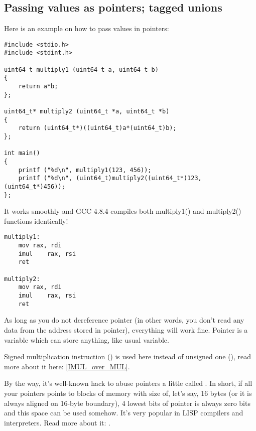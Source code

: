 \subsection{Passing values as pointers; tagged unions}

Here is an example on how to pass values in pointers:

\begin{lstlisting}[label=unsigned_multiply_C,style=customc]
#include <stdio.h>
#include <stdint.h>

uint64_t multiply1 (uint64_t a, uint64_t b)
{
	return a*b;
};

uint64_t* multiply2 (uint64_t *a, uint64_t *b)
{
	return (uint64_t*)((uint64_t)a*(uint64_t)b);
};

int main()
{
	printf ("%d\n", multiply1(123, 456));
	printf ("%d\n", (uint64_t)multiply2((uint64_t*)123, (uint64_t*)456));
};
\end{lstlisting}

It works smoothly and GCC 4.8.4 compiles both multiply1() and multiply2() functions identically!

\begin{lstlisting}[label=unsigned_multiply_lst,style=customasm]
multiply1:
	mov	rax, rdi
	imul	rax, rsi
	ret

multiply2:
	mov	rax, rdi
	imul	rax, rsi
	ret
\end{lstlisting}

As long as you do not dereference pointer (in other words, you don't read any data from the address stored in pointer), everything will work fine.
Pointer is a variable which can store anything, like usual variable.

Signed multiplication instruction (\IMUL) is used here instead of unsigned one (\MUL), read more about it here:
\ref{IMUL_over_MUL}.

By the way, it's well-known hack to abuse pointers a little called .
In short, if all your pointers points to blocks of memory with size of, let's say, 16 bytes (or it is always aligned on 16-byte boundary), 4 lowest bits of pointer is always zero bits and this space
can be used somehow.
It's very popular in LISP compilers and interpreters.
Read more about it: .


